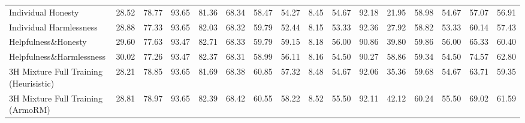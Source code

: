 \begin{table*}
{\begin{tabular}{lcccccccc|c|cc|cccc}
      Individual Honesty                     & 28.52                                     & 78.77            & 93.65                                      & 81.36                                  & 68.34                                 & 58.47                                   & 54.27                         & 8.45     & 54.67           & 92.18           & 21.95       & 58.98 & 54.67 & 57.07 & 56.91             \\
      Individual Harmlessness                & 28.88                                     & 77.33            & 93.65                                      & 82.03                                  & 68.32                                 & 59.79                                   & 52.44                         & 8.15     & 53.33           & 92.36           & 27.92       & 58.82 & 53.33 & 60.14 & 57.43             \\
      Helpfulness\&Honesty                   & 29.60                                     & 77.63            & 93.47                                      & 82.71                                  & 68.33                                 & 59.79                                   & 59.15                         & 8.18     & 56.00           & 90.86           & 39.80       & 59.86 & 56.00 & 65.33 & 60.40             \\
      Helpfulness\&Harmlessness              & 30.02                                     & 77.26            & 93.47                                      & 82.37                                  & 68.31                                 & 58.99                                   & 56.11                         & 8.16     & 54.50           & 90.27           & 58.86       & 59.34 & 54.50 & 74.57 & 62.80             \\ \midrule
      3H Mixture Full Training (Heurisistic) & 28.21                                     & 78.85            & 93.65                                      & 81.69                                  & 68.38                                 & 60.85                                   & 57.32                         & 8.48     & 54.67           & 92.06           & 35.36       & 59.68 & 54.67 & 63.71 & 59.35             \\
      3H Mixture Full Training (ArmoRM)      & 28.81                                     & 78.97            & 93.65                                      & 82.39                                  & 68.42                                 & 60.55                                   & 58.22                         & 8.52     & 55.50           & 92.11           & 42.12       & 60.24 & 55.50 & 69.02 & 61.59             \\

\end{tabular}}
\end{table*}
